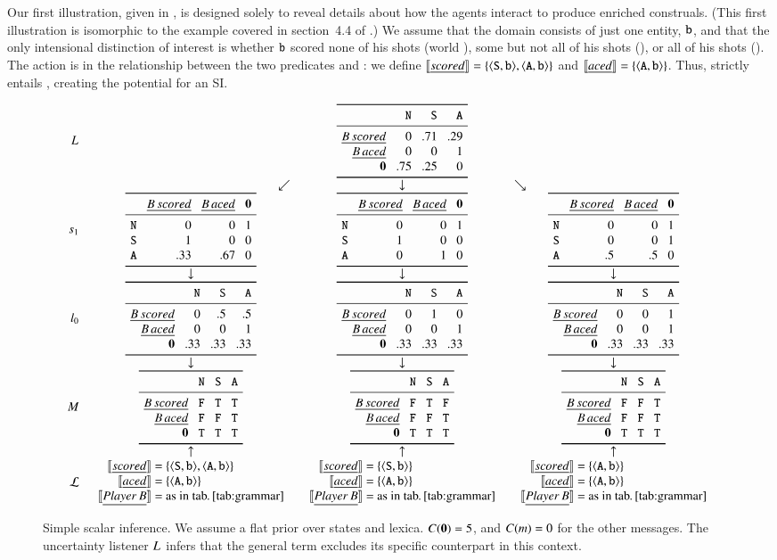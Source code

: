 \documentclass[leqno,12pt]{article}
\begin{document}
Our first illustration, given in , is
designed solely to reveal details about how the agents interact to
produce enriched construals. (This first illustration is isomorphic to
the example covered in section~4.4 of
\citealp{Bergen:Levy:Goodman:2014}.) We assume that the domain
consists of just one entity, $\texttt{b}$, and that the only intensional
distinction of interest is whether $\texttt{b}$ scored none of his shots
(world ), some but not all of his shots (), or all
of his shots (). The action is in the relationship between
the two predicates  and : we define
$\llbracket\emph{scored\/}\rrbracket = \left\{ \langle \texttt{S}, \texttt{b} \rangle,
  \langle \texttt{A}, \texttt{b} \rangle \right\}$
and $\llbracket\emph{aced\/}\rrbracket = \left\{ \langle \texttt{A}, \texttt{b} \rangle \right\}$. Thus,
 strictly entails , creating the potential for
an SI.

\begin{figure}[!t]
  \[
  \setlength{\arraycolsep}{5pt}
  \begin{array}{r c c c}
    \UncertaintyListener &
    & \genericscalar{0}{\graycell{.71}}{.29}{0}{0}{\graycell{1}}{\graycell{.75}}{.25}{0}
    \\
    & \multicolumn{1}{r}{\swarrow}& \multicolumn{1}{c}{\downarrow}& \multicolumn{1}{l}{\searrow}
    \\
    \speakerOne
    &
    \scalarspeaker{0}{0}{1}{1}{0}{0}{.33}{.67}{0}
    &
    \scalarspeaker{0}{0}{1}{1}{0}{0}{0}{1}{0}
    &
    \scalarspeaker{0}{0}{1}{0}{0}{1}{.5}{.5}{0}
    \\
    & \downarrow & \downarrow & \downarrow
    \\
    \listenerZero
    &
    \genericscalar{0}{.5}{.5}{0}{0}{1}{.33}{.33}{.33}
    &
    \genericscalar{0}{1}{0}{0}{0}{1}{.33}{.33}{.33}
    &
    \genericscalar{0}{0}{1}{0}{0}{1}{.33}{.33}{.33}
    \\
    & \downarrow & \downarrow & \downarrow 
    \\    
    \Messages
    &
    \genericscalar{\False}{\True}{\True}{\False}{\False}{\True}{\True}{\True}{\True}
    &
    \genericscalar{\False}{\True}{\False}{\False}{\False}{\True}{\True}{\True}{\True}
    &
    \genericscalar{\False}{\False}{\True}{\False}{\False}{\True}{\True}{\True}{\True}
    \\
    & \uparrow & \uparrow & \uparrow 
    \\                               
    \Lex
    & 
    \scalarlex{\tuple{\world{S},\playerb}, \tuple{\world{A},\playerb}}
    & 
    \scalarlex{\tuple{\world{S},\playerb}}
    &
    \scalarlex{\tuple{\world{A},\playerb}}   
  \end{array}
  \]
  \caption{Simple scalar inference. 
    We assume a flat prior over states and lexica. 
    $C(\mathbf{0}) = 5$, and $C(m) = 0$ for the other messages. 
    The uncertainty listener $L_{}$ infers that the general term 
     excludes its specific counterpart  in this context.}
  \label{fig:simplescalar}
\end{figure}
\end{document}
